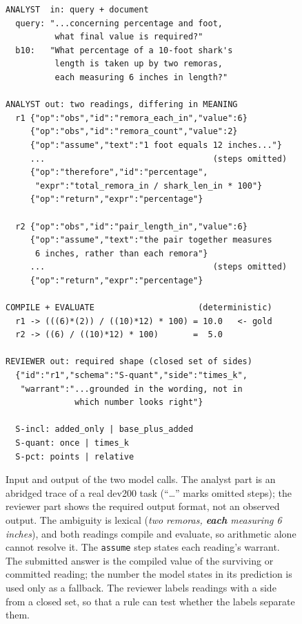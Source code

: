 \begin{figure}[!t]
\small
\begin{lstlisting}[basicstyle=\ttfamily\scriptsize,breaklines=true,frame=none,
                   xleftmargin=0pt,columns=fullflexible]
ANALYST  in: query + document
  query: "...concerning percentage and foot,
          what final value is required?"
  b10:   "What percentage of a 10-foot shark's
          length is taken up by two remoras,
          each measuring 6 inches in length?"

ANALYST out: two readings, differing in MEANING
  r1 {"op":"obs","id":"remora_each_in","value":6}
     {"op":"obs","id":"remora_count","value":2}
     {"op":"assume","text":"1 foot equals 12 inches..."}
     ...                                  (steps omitted)
     {"op":"therefore","id":"percentage",
      "expr":"total_remora_in / shark_len_in * 100"}
     {"op":"return","expr":"percentage"}

  r2 {"op":"obs","id":"pair_length_in","value":6}
     {"op":"assume","text":"the pair together measures
      6 inches, rather than each remora"}
     ...                                  (steps omitted)
     {"op":"return","expr":"percentage"}

COMPILE + EVALUATE                     (deterministic)
  r1 -> (((6)*(2)) / ((10)*12) * 100) = 10.0   <- gold
  r2 -> ((6) / ((10)*12) * 100)       =  5.0

REVIEWER out: required shape (closed set of sides)
  {"id":"r1","schema":"S-quant","side":"times_k",
   "warrant":"...grounded in the wording, not in
              which number looks right"}

  S-incl: added_only | base_plus_added
  S-quant: once | times_k
  S-pct: points | relative
\end{lstlisting}
\caption{Input and output of the two model calls. The analyst part is an
abridged trace of a real dev200 task (``\ldots'' marks omitted steps); the
reviewer part shows the required output format, not an observed output. The
ambiguity is lexical (\emph{two remoras, \textbf{each} measuring 6 inches}),
and both readings compile and evaluate, so arithmetic alone cannot resolve it.
The \texttt{assume} step states each reading's warrant. The submitted answer
is the compiled value of the surviving or committed reading; the number the
model states in its prediction is used only as a fallback. The reviewer labels readings with a side from a closed
set, so that a rule can test whether the labels separate them.}
\label{fig:io}
\end{figure}
